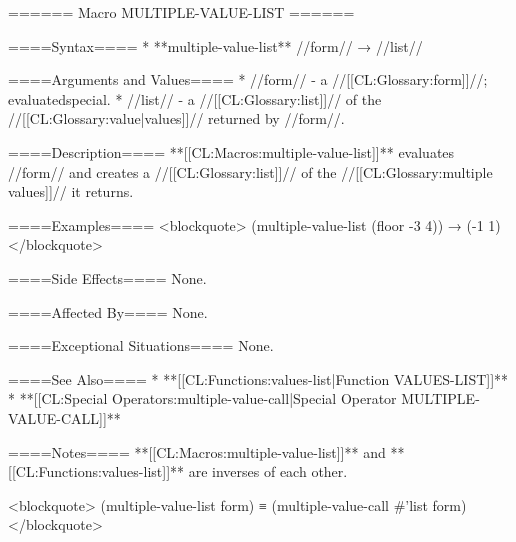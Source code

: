 ====== Macro MULTIPLE-VALUE-LIST ======

====Syntax====
  * **multiple-value-list** //form// → //list//

====Arguments and Values====
  * //form// - a //[[CL:Glossary:form]]//; evaluatedspecial.
  * //list// - a //[[CL:Glossary:list]]// of the //[[CL:Glossary:value|values]]// returned by //form//.

====Description====
**[[CL:Macros:multiple-value-list]]** evaluates //form// and creates a //[[CL:Glossary:list]]// of the //[[CL:Glossary:multiple values]]// it returns.

====Examples====
<blockquote> (multiple-value-list (floor -3 4)) → (-1 1) </blockquote>

====Side Effects====
None.

====Affected By====
None.

====Exceptional Situations====
None.

====See Also====
  * **[[CL:Functions:values-list|Function VALUES-LIST]]**
  * **[[CL:Special Operators:multiple-value-call|Special Operator MULTIPLE-VALUE-CALL]]**

====Notes====
**[[CL:Macros:multiple-value-list]]** and **[[CL:Functions:values-list]]** are inverses of each other.

<blockquote> (multiple-value-list form) ≡ (multiple-value-call #'list form) </blockquote>

